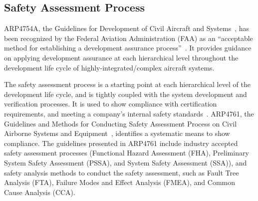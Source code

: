 \subsection{Safety Assessment Process}
\label{subsec:process}

ARP4754A, the Guidelines for Development of Civil Aircraft and Systems~\cite{SAE:ARP4754A}, has been recognized by the Federal Aviation Administration (FAA) as an ``acceptable method for establishing a development assurance process''~\cite{AC:20-174}. It provides guidance on applying development assurance at each hierarchical level throughout the development life cycle of highly-integrated/complex aircraft systems.


The safety assessment process is a starting point at each hierarchical level of the development life cycle, and is tightly coupled with the system development and verification processes. It is used to show compliance with certification requirements, and meeting a company's internal safety standards~\cite{SAE:ARP4754A}. ARP4761, the Guidelines and Methods for Conducting Safety Assessment Process on Civil Airborne Systems and Equipment~\cite{SAE:ARP4761},  identifies a systematic means to show compliance. The guidelines presented in ARP4761 include industry accepted safety assessment processes (Functional Hazard Assessment (FHA), Preliminary System Safety Assessment (PSSA), and System Safety Assessment (SSA)), and safety analysis methods to conduct the safety assessment, 
such as Fault Tree Analysis (FTA), Failure Modes and Effect Analysis (FMEA), and Common Cause Analysis (CCA).

